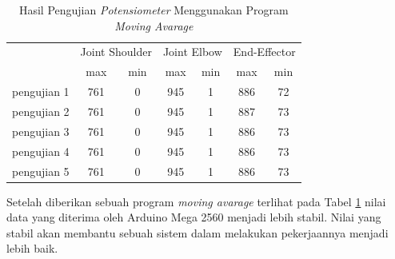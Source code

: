 \begin{table}[H]
	\centering
	\caption{Hasil Pengujian \textit{Potensiometer} Menggunakan Program \textit{Moving Avarage}}
	\label{tbl.potensiometer2}
	\begin{tabular}{|c|c|c|c|c|c|c|}
		\hline
		\rowcolor[HTML]{9B9B9B} 
		\cellcolor[HTML]{9B9B9B}                            & \multicolumn{2}{c|}{\cellcolor[HTML]{9B9B9B}Joint Shoulder} & \multicolumn{2}{c|}{\cellcolor[HTML]{9B9B9B}Joint Elbow} & \multicolumn{2}{c|}{\cellcolor[HTML]{9B9B9B}End-Effector} \\ \cline{2-7} 
		\rowcolor[HTML]{9B9B9B} 
		\multirow{-2}{*}{\cellcolor[HTML]{9B9B9B}Pengujian} & max                          & min                          & max                         & min                        & max                         & min                         \\ \hline
		pengujian 1                                         & 761                          & 0                            & 945                         & 1                          & 886                         & 72                          \\ \hline
		pengujian 2                                         & 761                          & 0                            & 945                         & 1                          & 887                         & 73                          \\ \hline
		pengujian 3                                         & 761                          & 0                            & 945                         & 1                          & 886                         & 73                          \\ \hline
		pengujian 4                                         & 761                          & 0                            & 945                         & 1                          & 886                         & 73                          \\ \hline
		pengujian 5                                         & 761                          & 0                            & 945                         & 1                          & 886                         & 73                          \\ \hline
	\end{tabular}
	
\end{table} 

Setelah diberikan sebuah program \textit{moving avarage} terlihat pada Tabel \ref{tbl.potensiometer2} nilai data yang diterima oleh Arduino Mega 2560 menjadi lebih stabil. Nilai yang stabil akan membantu sebuah sistem dalam melakukan pekerjaannya menjadi lebih baik.

